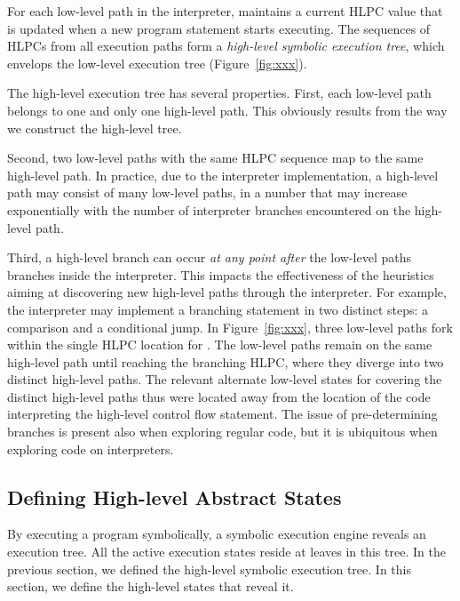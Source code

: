 For each low-level path in the interpreter, \chef maintains a current HLPC value that is updated when a new program statement starts executing.
%
The sequences of HLPCs from all execution paths form a \emph{high-level symbolic execution tree}, which envelops the low-level execution tree (Figure~\ref{fig:xxx}).

The high-level execution tree has several properties.  First, each low-level path belongs to one and only one high-level path.  This obviously results from the way we construct the high-level tree.

Second, two low-level paths with the same HLPC sequence map to the same high-level path.  In practice, due to the interpreter implementation, a high-level path may consist of many low-level paths, in a number that may increase exponentially with the number of interpreter branches encountered on the high-level path.

Third, a high-level branch can occur \emph{at any point after} the low-level paths branches inside the interpreter.  This impacts the effectiveness of the heuristics aiming at discovering new high-level paths through the interpreter.
%
For example, the interpreter may implement a branching statement in two distinct steps: a comparison and a conditional jump.  In Figure~\ref{fig:xxx}, three low-level paths fork within the single HLPC location for .  The low-level paths remain on the same high-level path until reaching the branching HLPC, where they diverge into two distinct high-level paths.  The relevant alternate low-level states for covering the distinct high-level paths thus were located away from the location of the code interpreting the high-level control flow statement.
%
The issue of pre-determining branches is present also when exploring regular code, but it is ubiquitous when exploring code on interpreters.



\subsection{Defining High-level Abstract States}
\label{sec:chef:hlstates}

By executing a program symbolically, a symbolic execution engine reveals an execution tree.  All the active execution states reside at leaves in this tree.
%
In the previous section, we defined the high-level symbolic execution tree.  In this section, we define the high-level states that reveal it.

